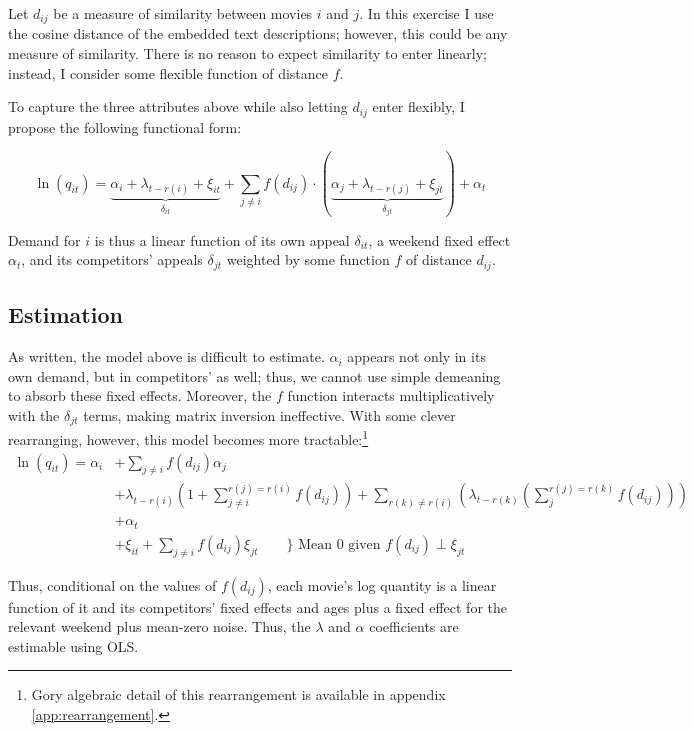 \documentclass{article}
\begin{document}
Let $d_{ij}$ be a measure of similarity between movies $i$ and $j$. In this exercise I use the cosine distance of the embedded text descriptions; however, this could be any measure of similarity. There is no reason to expect similarity to enter linearly; instead, I consider some flexible function of distance $f$. 

To capture the three attributes above while also letting $d_{ij}$ enter flexibly, I propose the following functional form:

$$\ln(q_{it}) = \underbrace{\alpha_i + \lambda_{t - r(i)} + \xi_{it}}_{\delta_{it}} + \sum_{j \neq i} f(d_{ij}) \cdot (\underbrace{\alpha_j + \lambda_{t - r(j)} + \xi_{jt}}_{\delta_{jt}}) + \alpha_t$$

Demand for $i$ is thus a linear function of its own appeal $\delta_{it}$, a weekend fixed effect $\alpha_t$, and its competitors' appeals $\delta_{jt}$ weighted by some function $f$ of distance $d_{ij}$. 

\subsection{Estimation}

As written, the model above is difficult to estimate. $\alpha_i$ appears not only in its own demand, but in competitors' as well; thus, we cannot use simple demeaning to absorb these fixed effects. Moreover, the $f$ function interacts multiplicatively with the $\delta_{jt}$ terms, making matrix inversion ineffective. With some clever rearranging, however, this model becomes more tractable:\footnote{Gory algebraic detail of this rearrangement is available in appendix \ref{app:rearrangement}.}
\begin{align*}
    \ln(q_{it}) = \alpha_i &+ \sum_{j \neq i} f(d_{ij}) \alpha_j \\
    &+ \lambda_{t - r(i)} \left(1 + \sum_{j \neq i}^{r(j) = r(i)} f(d_{ij})\right) + \sum_{r(k) \neq r(i)} \left(\lambda_{t - r(k)} \left(\sum_{j}^{r(j) = r(k)} f(d_{ij}) \right)\right) \\
    &+ \alpha_t \\
    &+ \xi_{it} + \sum_{j \neq i} f(d_{ij}) \xi_{jt} \qquad \bigg\} \text{ Mean 0 given $f(d_{ij}) \perp \xi_{jt}$}
\end{align*}

Thus, conditional on the values of $f(d_{ij})$, each movie's log quantity is a linear function of it and its competitors' fixed effects and ages plus a fixed effect for the relevant weekend plus mean-zero noise. Thus, the $\lambda$ and $\alpha$ coefficients are estimable using OLS.
\end{document}
